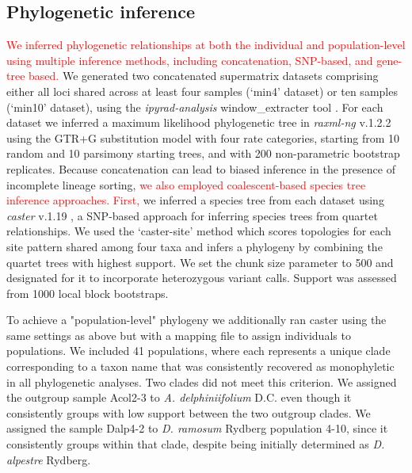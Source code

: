 \documentclass[11pt]{article}
\begin{document}
\subsection{Phylogenetic inference}
\textcolor{red}{
We inferred phylogenetic relationships at both the individual and population-level using multiple inference methods, including concatenation, SNP-based, and gene-tree based.} 
%
We generated two concatenated supermatrix datasets comprising either
all loci shared across at least four samples (`min4' dataset) or 
ten samples (`min10' dataset), using the \emph{ipyrad-analysis} 
window\_extracter tool \citep{eaton_ipyrad_2020}.
%
For each dataset we inferred a maximum likelihood phylogenetic tree in
\emph{raxml-ng} v.1.2.2 \citep{kozlov_raxml-ng_2019} using the GTR+G substitution
model with four rate categories, starting from 10 random and 10 parsimony 
starting trees, and with 200 non-parametric bootstrap replicates. 
%
Because concatenation can lead to biased inference in the presence of incomplete
lineage sorting, 
\textcolor{red}{
we also employed coalescent-based species tree inference approaches.
First,} we inferred a species tree from each dataset using 
\emph{caster} v.1.19 \citep{doi:10.1126/science.adk9688}, a SNP-based approach 
for inferring species trees from quartet relationships.
We used the `caster-site’ method which scores topologies for each site pattern 
shared among four taxa and infers a phylogeny by combining the quartet
trees with highest support. We set the chunk size parameter to 500 
and designated for it to incorporate heterozygous variant calls.
Support was assessed from 1000 local block bootstraps. 

To achieve a "population-level" phylogeny we additionally ran caster using the same
settings as above but with a mapping file to assign individuals to populations.
We included 41 populations, where each represents a unique clade corresponding to a taxon name
that was consistently recovered as monophyletic in all phylogenetic analyses. 
Two clades did not meet this criterion.
We assigned the outgroup sample Acol2-3 to \emph{A. delphiniifolium} D.C. even though
it consistently groups with low support between the two outgroup clades. 
We assigned the sample Dalp4-2 to \emph{D. ramosum} Rydberg population 4-10, 
since it consistently groups within that clade, despite being initially 
determined as \emph{D. alpestre} Rydberg.
\end{document}
